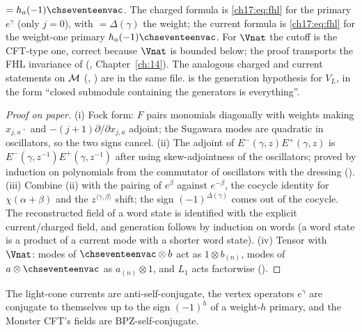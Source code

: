 \begin{dictionary}
 $=h_a(-1)\chseventeenvac$.  The charged formula is \eqref{ch17:eq:fhl} for the primary $e^\gamma$ (only
$j=0$), with  $=\Delta(\gamma)$ the weight; the current formula is \eqref{ch17:eq:fhl} for the weight-one primary
$h_a(-1)\chseventeenvac$.  For $\Vnat$ the cutoff  is the CFT-type one, correct because $\Vnat$ is bounded below;
the proof transports the FHL invariance of  (, Chapter~\ref{ch:14}).  The analogous charged and
current statements on $\mathcal{M}$ (,
) are in the same file.  
is the generation hypothesis  for $V_L$, in the form ``closed submodule containing the generators is everything''.
\end{dictionary}

\begin{proof}[Proof on paper]
(i) Fock form: $F$ pairs monomials diagonally with weights making $x_{j,a}\cdot$ and $-(j+1)\partial/\partial x_{j,a}$ adjoint; the
Sugawara modes are quadratic in oscillators, so the two signs cancel.  (ii) The adjoint of $E^-(\gamma,z)E^+(\gamma,z)$ is
$E^-(\gamma,z^{-1})E^+(\gamma,z^{-1})$ after using skew-adjointness of the oscillators; proved by induction on polynomials from the
commutator of oscillators with the dressing ().  (iii) Combine (ii) with the
pairing of $e^\beta$ against $e^{-\beta}$, the cocycle identity for $\chi(\alpha+\beta)$ and the $z^{\langle\gamma,\beta\rangle}$ shift; the sign
$(-1)^{\Delta(\gamma)}$ comes out of the cocycle.  The reconstructed field of a word state is identified with the explicit current/charged
field, and generation follows by induction on words (a word state is a product of a current mode with a shorter word state).
(iv) Tensor with $\Vnat$: modes of $\chseventeenvac\otimes b$ act as $1\otimes b_{(n)}$, modes of $a\otimes\chseventeenvac$ as $a_{(n)}\otimes1$,
and $L_1$ acts factorwise ().
\end{proof}

\begin{physics}
The light-cone currents are anti-self-conjugate, the vertex operators $e^\gamma$ are conjugate to themselves up to the sign
$(-1)^{h}$ of a weight-$h$ primary, and the Monster CFT's fields are BPZ-self-conjugate.
\end{physics}

